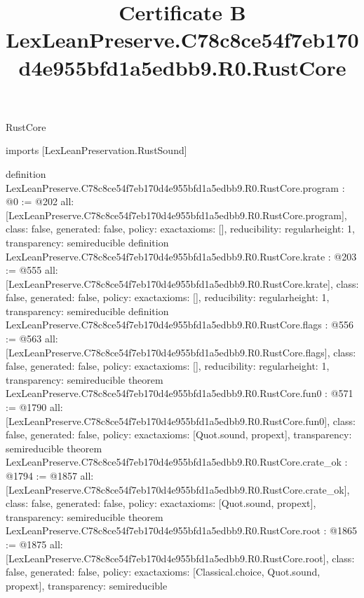 \begin{lexlean}{RustCore}
\title{Certificate B LexLeanPreserve.C78c8ce54f7eb170d4e955bfd1a5edbb9.R0.RustCore}
\begin{coremodule}
imports [LexLeanPreservation.RustSound]

definition LexLeanPreserve.C78c8ce54f7eb170d4e955bfd1a5edbb9.R0.RustCore.program : @0 := @202 {
  all: [LexLeanPreserve.C78c8ce54f7eb170d4e955bfd1a5edbb9.R0.RustCore.program],
  class: false,
  generated: false,
  policy: exact{axioms: []},
  reducibility: regular{height: 1},
  transparency: semireducible
}
definition LexLeanPreserve.C78c8ce54f7eb170d4e955bfd1a5edbb9.R0.RustCore.krate : @203 := @555 {
  all: [LexLeanPreserve.C78c8ce54f7eb170d4e955bfd1a5edbb9.R0.RustCore.krate],
  class: false,
  generated: false,
  policy: exact{axioms: []},
  reducibility: regular{height: 1},
  transparency: semireducible
}
definition LexLeanPreserve.C78c8ce54f7eb170d4e955bfd1a5edbb9.R0.RustCore.flags : @556 := @563 {
  all: [LexLeanPreserve.C78c8ce54f7eb170d4e955bfd1a5edbb9.R0.RustCore.flags],
  class: false,
  generated: false,
  policy: exact{axioms: []},
  reducibility: regular{height: 1},
  transparency: semireducible
}
theorem LexLeanPreserve.C78c8ce54f7eb170d4e955bfd1a5edbb9.R0.RustCore.fun0 : @571 := @1790 {
  all: [LexLeanPreserve.C78c8ce54f7eb170d4e955bfd1a5edbb9.R0.RustCore.fun0],
  class: false,
  generated: false,
  policy: exact{axioms: [Quot.sound, propext]},
  transparency: semireducible
}
theorem LexLeanPreserve.C78c8ce54f7eb170d4e955bfd1a5edbb9.R0.RustCore.crate_ok : @1794 := @1857 {
  all: [LexLeanPreserve.C78c8ce54f7eb170d4e955bfd1a5edbb9.R0.RustCore.crate_ok],
  class: false,
  generated: false,
  policy: exact{axioms: [Quot.sound, propext]},
  transparency: semireducible
}
theorem LexLeanPreserve.C78c8ce54f7eb170d4e955bfd1a5edbb9.R0.RustCore.root : @1865 := @1875 {
  all: [LexLeanPreserve.C78c8ce54f7eb170d4e955bfd1a5edbb9.R0.RustCore.root],
  class: false,
  generated: false,
  policy: exact{axioms: [Classical.choice, Quot.sound, propext]},
  transparency: semireducible
}


\end{coremodule}
\end{lexlean}
